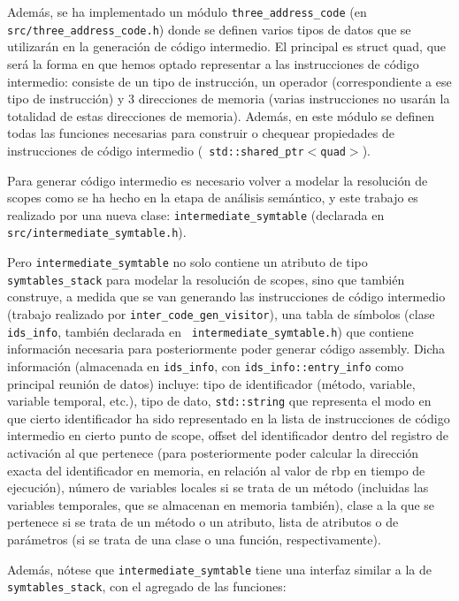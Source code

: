 \documentclass[12pt, a4paper, titlepage]{article}
\begin{document}
	Además, se ha implementado un módulo {\tt three\_address\_code} (en {\tt
	src/three\_address\_code.h}) donde se definen varios tipos de datos que se
	utilizarán en la generación de código intermedio. El principal es struct quad,
	que será la forma en que hemos optado representar a las instrucciones de
	código intermedio: consiste de un tipo de instrucción, un operador
	(correspondiente a ese tipo de instrucción) y 3 direcciones de memoria (varias
	instrucciones no usarán la totalidad de estas direcciones de memoria). Además,
	en este módulo se definen todas las funciones necesarias para construir o
	chequear propiedades de instrucciones de código intermedio ({\tt
	std::shared\_ptr$<$quad$>$}).

	Para generar código intermedio es necesario volver a modelar la resolución de
	scopes como se ha hecho en la etapa de análisis semántico, y este trabajo es
	realizado por una nueva clase: {\tt intermediate\_symtable} (declarada en {\tt
	src/intermediate\_symtable.h}).

	Pero {\tt intermediate\_symtable} no solo contiene un atributo de tipo {\tt
	symtables\_stack} para modelar la resolución de scopes, sino que también
	construye, a medida que se van generando las instrucciones de código
	intermedio (trabajo realizado por {\tt inter\_code\_gen\_visitor}), una tabla
	de símbolos (clase {\tt ids\_info}, también declarada en {\tt
	intermediate\_symtable.h}) que contiene información necesaria para
	posteriormente poder generar código assembly. Dicha información (almacenada en
	{\tt ids\_info}, con {\tt ids\_info::entry\_info} como principal reunión de
	datos) incluye: tipo de identificador (método, variable, variable temporal,
	etc.), tipo de dato, {\tt std::string} que representa el modo en que cierto
	identificador ha sido representado en la lista de instrucciones de código
	intermedio en cierto punto de scope, offset del identificador dentro del
	registro de activación al que pertenece (para posteriormente poder calcular la
	dirección exacta del identificador en memoria, en relación al valor de rbp en
	tiempo de ejecución), número de variables locales si se trata de un método
	(incluidas las variables temporales, que se almacenan en memoria también),
	clase a la que se pertenece si se trata de un método o un atributo, lista de
	atributos o de parámetros (si se trata de una clase o una función,
	respectivamente).

	Además, nótese que {\tt intermediate\_symtable} tiene una interfaz similar a
	la de {\tt symtables\_stack}, con el agregado de las funciones:
\end{document}
